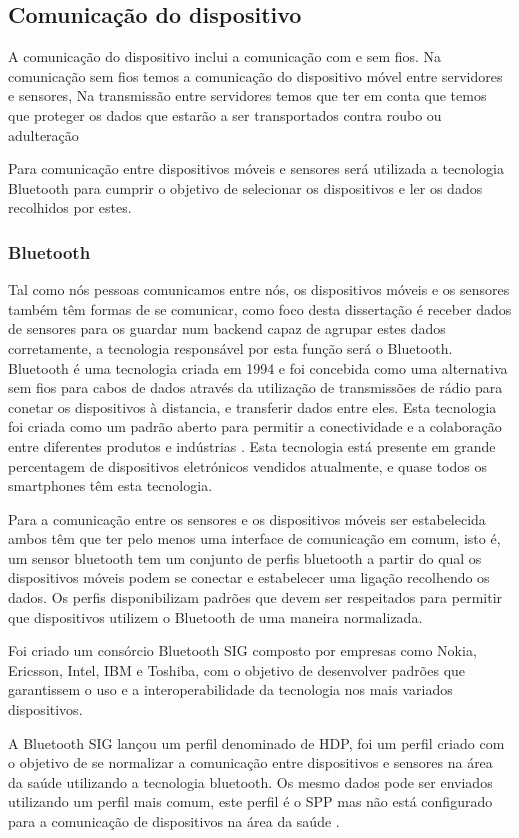 \subsection{Comunicação do dispositivo}
A comunicação do dispositivo inclui a comunicação com e sem fios. Na comunicação sem fios temos a comunicação do dispositivo móvel entre servidores e sensores, Na transmissão entre servidores temos que ter em conta que temos que proteger os dados que estarão a ser transportados contra roubo ou adulteração
\par
Para comunicação entre dispositivos móveis e sensores será utilizada a tecnologia Bluetooth para cumprir o objetivo de selecionar os dispositivos e ler os dados recolhidos por estes.


\subsubsection{Bluetooth}

Tal como nós pessoas comunicamos entre nós, os dispositivos móveis e os sensores também têm formas de se comunicar, como foco desta dissertação é receber dados de sensores para os guardar num backend capaz de agrupar estes dados corretamente, a tecnologia responsável por esta função será o Bluetooth.
Bluetooth é uma tecnologia criada em 1994 e foi concebida como uma alternativa sem fios para cabos de dados através da utilização de transmissões de rádio para conetar os dispositivos à distancia, e transferir dados entre eles. Esta tecnologia foi criada como um padrão aberto para permitir a conectividade e a colaboração entre diferentes produtos e indústrias \cite{bluetooth}.
Esta tecnologia está presente em grande percentagem de dispositivos eletrónicos vendidos atualmente, e quase todos os smartphones têm esta tecnologia.
\par 
Para a comunicação entre os sensores e os dispositivos móveis ser estabelecida ambos têm que ter pelo menos uma interface de comunicação em comum, isto é, um sensor bluetooth tem um conjunto de perfis bluetooth a partir do qual os dispositivos móveis podem se conectar e estabelecer uma ligação recolhendo os dados. 
Os perfis disponibilizam padrões que devem ser respeitados para permitir que dispositivos utilizem o Bluetooth de uma maneira normalizada. 
\par 
Foi criado um consórcio Bluetooth \gls{SIG} composto por empresas como Nokia, Ericsson, Intel, IBM e Toshiba, com o objetivo de desenvolver padrões que garantissem o uso e a interoperabilidade da tecnologia nos mais variados dispositivos.
\par
A Bluetooth \gls{SIG} lançou um perfil denominado de \gls{HDP}, foi um perfil criado com o objetivo de se normalizar a comunicação entre dispositivos e sensores na área da saúde utilizando a tecnologia bluetooth. Os mesmo dados pode ser enviados utilizando um perfil mais comum, este perfil é o \gls{SPP} mas não está configurado para a comunicação de dispositivos na área da saúde \cite{bt-article}.



